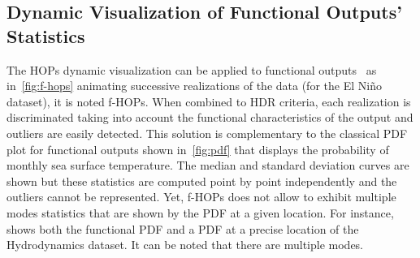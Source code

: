 \subsection{Dynamic Visualization of Functional Outputs' Statistics}
\label{subsec:fhop}

%



The HOPs dynamic visualization can be applied to functional outputs~\citep{Kale2018} as in~\cref{fig:f-hops} animating successive realizations of the data (for the El Ni\~no dataset), it is noted f-HOPs. When combined to HDR criteria, each realization is discriminated taking into account the functional characteristics of the output and outliers are easily detected. This solution is complementary to the classical PDF plot for functional outputs shown in~\cref{fig:pdf} that displays the probability of monthly sea surface temperature. The median and standard deviation curves are shown but these statistics are computed point by point independently and the outliers cannot be represented. Yet, f-HOPs does not allow to exhibit multiple modes statistics that are shown by the PDF at a given location. For instance,  shows both the functional PDF and a PDF at a precise location of the Hydrodynamics dataset. It can be noted that there are multiple modes.


